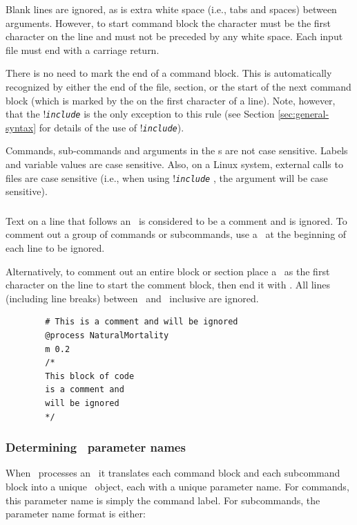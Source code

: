Blank lines are ignored, as is extra white space (i.e., tabs and spaces) between arguments. However, to start command block the \command{} character must be the first character on the line and must not be preceded by any white space. Each input file must end with a carriage return.

There is no need to mark the end of a command block. This is automatically recognized by either the end of the file, section, or the start of the next command block (which is marked by the \command{} on the first character of a line). Note, however, that the !\texttt{\emph{include}} is the only exception to this rule (see Section \ref{sec:general-syntax} for details of the use of !\texttt{\emph{include}}). 

Commands, sub-commands and arguments in the \config s are not case sensitive. Labels and variable values are case sensitive. Also, on a Linux system, external calls to files are case sensitive (i.e., when using !\texttt{\emph{include}} , the argument  will be case sensitive). 


\subsubsection{}
Text on a line that follows an \commentline\ is considered to be a comment and is ignored. To comment out a group of commands or subcommands, use a \commentline\ at the beginning of each line to be ignored.

Alternatively, to comment out an entire block or section place a \commentstart\ as the first character on the line to start the comment block, then end it with \commentend. All lines (including line breaks) between \commentstart\ and \commentend\ inclusive are ignored. 
{\small{\begin{verbatim}
		# This is a comment and will be ignored
		@process NaturalMortality
		m 0.2
		/* 
		This block of code 
		is a comment and
		will be ignored
		*/
		\end{verbatim}}}

\subsubsection{Determining \IBM\ parameter names\label{sec:parameter-names}}

When \IBM\ processes an \config\ it translates each command block and each subcommand block into a unique \IBM\ object, each with a unique parameter name. For commands, this parameter name is simply the command label. For subcommands, the parameter name format is either: 

